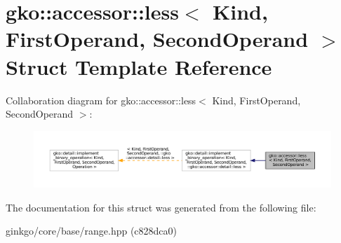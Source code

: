 \hypertarget{structgko_1_1accessor_1_1less}{}\section{gko\+:\+:accessor\+:\+:less$<$ Kind, First\+Operand, Second\+Operand $>$ Struct Template Reference}
\label{structgko_1_1accessor_1_1less}


Collaboration diagram for gko\+:\+:accessor\+:\+:less$<$ Kind, First\+Operand, Second\+Operand $>$\+:
\nopagebreak
\begin{figure}[H]
\begin{center}
\leavevmode
\includegraphics[width=350pt]{structgko_1_1accessor_1_1less__coll__graph}
\end{center}
\end{figure}


The documentation for this struct was generated from the following file\+:\begin{DoxyCompactItemize}
\item 
ginkgo/core/base/range.\+hpp (c828dca0)\end{DoxyCompactItemize}
